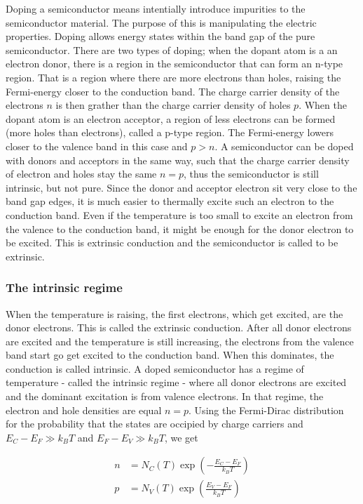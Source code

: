 \documentclass[a4paper]{article}
\begin{document}
Doping a semiconductor means intentially introduce impurities to the semiconductor material. The purpose of this is manipulating the electric properties. Doping allows energy states within the band gap of the pure semiconductor. There are two types of doping; when the dopant atom is a an electron donor, there is a region in the semiconductor that can form an n-type region. That is a region where there are more electrons than holes, raising the Fermi-energy closer to the conduction band. The charge carrier density of the electrons $n$ is then grather than the charge carrier density of holes $p$. When the dopant atom is an electron acceptor, a region of less electrons can be formed (more holes than electrons), called a p-type region. The Fermi-energy lowers closer to the valence band in this case and $p > n$. A semiconductor can be doped with donors and acceptors in the same way, such that the charge carrier density of electron and holes stay the same $n=p$, thus the semiconductor is still intrinsic, but not pure. Since the donor and acceptor electron sit very close to the band gap edges, it is much easier to thermally excite such an electron to the conduction band. Even if the temperature is too small to excite an electron from the valence to the conduction band, it might be enough for the donor electron to be excited. This is extrinsic conduction and the semiconductor is called to be extrinsic.

\subsubsection{The intrinsic regime}

When the temperature is raising, the first electrons, which get excited, are the donor electrons. This is called the extrinsic conduction. After all donor electrons are excited and the temperature is still increasing, the electrons from the valence band start go get excited to the conduction band. When this dominates, the conduction is called intrinsic. A doped semiconductor has a regime of temperature - called the intrinsic regime - where all donor electrons are excited and the dominant excitation is from valence electrons. In that regime, the electron and hole densities are equal $n=p$. Using the Fermi-Dirac distribution for the probability that the states are occipied by charge carriers and $E_C - E_F \gg k_B T$ and $E_F - E_V \gg k_B T$, we get

\begin{subequations}
\begin{align}
    n &= N_C(T) \exp{\left(-\frac{E_C - E_F}{k_B T} \right)} \label{eq:n} \\
    p &= N_V(T) \exp{\left(\frac{E_V - E_F}{k_B T} \right)} \label{eq:p}
\end{align}
\end{subequations}
\end{document}
